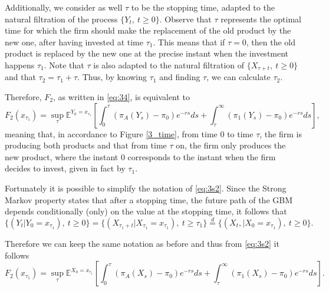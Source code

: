 Additionally, we consider as well $\tau$ to be the stopping time, adapted to the natural filtration of the process $\{Y_t, \ t\geq0\}$. Observe that $\tau$ represents the optimal time for which the firm should make the replacement of the old product by the new one, after having invested at time $\tau_1$. This means that  if $\tau=0$, then the old product is replaced by the new one at the precise instant when the investment happens $\tau_1$. Note that $\tau$ is also adapted to the natural filtration of $\{ X_{\tau+t},\ t\geq0 \}$ and that $\tau_2=\tau_1+\tau$. Thus, by knowing $\tau_1$ and finding $\tau$, we can calculate $\tau_2$.

Therefore, $F_2$, as written in \eqref{eq:34}, is equivalent to
\begin{equation}
F_2(x_{\tau_1})=\sup_{\tau} \mathds{E}^{Y_0=x_{\tau_1}} \left[ \int_0^{\tau} \left( \pi_A(Y_s)-\pi_0 \right) e^{-rs}ds + \int_{\tau}^\infty \left( \pi_1(Y_s)-\pi_0 \right) e^{-rs}ds  \right],
\label{eq:3s2}
\end{equation}
meaning that, in accordance to Figure \ref{3_time}, from time 0 to time $\tau$, the firm is producing both products and that from time $\tau$ on, the firm only produces the new product, where the instant 0 corresponds to the instant when the firm decides to invest, given in fact by $\tau_1$.

Fortunately it is possible to simplify the notation of \eqref{eq:3s2}. Since the Strong Markov property states that after a stopping time, the future path of the GBM depends conditionally (only) on the value at the stopping time, it follows that 
$$\{(Y_t | Y_0=x_{\tau_1}), \ t\geq0 \} = \{(X_{\tau_1+t} | X_{\tau_1}=x_{\tau_1}),\ t\geq \tau_1 \} \overset{d}{=}  \{(X_{t}, | X_0=x_{\tau_1}), \ t\geq0 \}. $$

Therefore we can keep the same notation as before and thus from \eqref{eq:3s2} it follows
\begin{equation}
F_2(x_{\tau_1})=\sup_{\tau} \mathds{E}^{X_0=x_{\tau_1}} \left[ \int_0^{\tau} \left( \pi_A(X_s)-\pi_0 \right) e^{-rs}ds + \int_{\tau}^\infty \left( \pi_1(X_s)-\pi_0 \right) e^{-rs}ds  \right].
\label{eq:3s3}
\end{equation}


